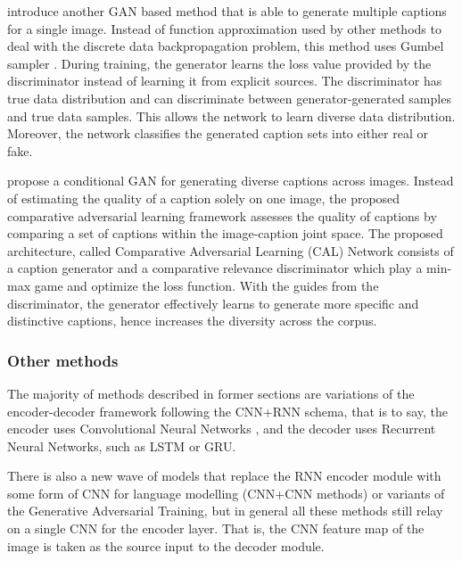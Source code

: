 \cite{Shetty2017} introduce another GAN based method that is able to generate multiple captions for a single image. Instead of function approximation used by other methods to deal with the discrete data backpropagation problem, this method uses Gumbel sampler \citep{Jang2017}. During training, the generator learns the loss value provided by the discriminator instead of learning it from explicit sources. The discriminator has true data distribution and can discriminate between generator-generated samples and true data samples. This allows the network to learn diverse data distribution. Moreover, the network classifies the generated caption sets into either real or fake.

\cite{Li2018_CAL} propose a conditional GAN for generating diverse captions across images. Instead of estimating the quality of a caption solely on one image, the proposed comparative adversarial learning framework assesses the quality of captions by comparing a set of captions within the image-caption joint space. The proposed architecture, called Comparative Adversarial Learning (CAL) Network consists of a caption generator and a comparative relevance discriminator which play a min-max game and optimize the loss function. With the guides from the discriminator, the generator effectively learns to generate more specific and distinctive captions, hence increases the diversity across the corpus.

\subsubsection{Other methods}

The majority of methods described in former sections are variations of the encoder-decoder framework following the CNN+RNN schema, that is to say, the encoder uses Convolutional Neural Networks \cite{Lecun1998}, and the decoder uses Recurrent Neural Networks, such as LSTM\citep{Hochreiter1997} or GRU\citep{Chung2014}.

There is also a new wave of models that replace the RNN encoder module with some form of CNN for language modelling (CNN+CNN methods) or variants of the Generative Adversarial Training, but in general all these methods still relay on a single CNN for the encoder layer. That is, the CNN feature map of the image is taken as the source input to the decoder module.


